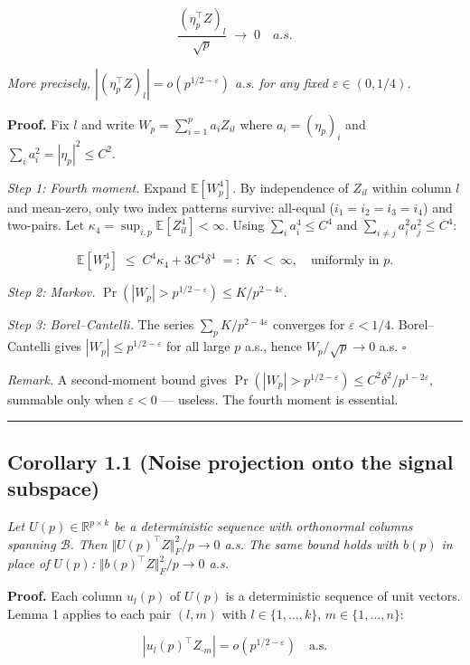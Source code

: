 \documentclass{article}
\theoremstyle{remark}
\begin{document}
\[
\frac{(\eta_p^\top Z)_l}{\sqrt{p}} \;\longrightarrow\; 0 \quad a.s.
\]

\textit{More precisely, $|(\eta_p^\top Z)_l| = o(p^{1/2-\varepsilon})$ a.s. for any fixed $\varepsilon\in(0,1/4)$.}

\textbf{Proof.} Fix $l$ and write $W_p = \sum_{i=1}^p a_i Z_{il}$ where $a_i = (\eta_p)_i$ and $\sum_i a_i^2 = |\eta_p|^2 \le C^2$.

\textit{Step 1: Fourth moment.} Expand $\mathbb{E}[W_p^4]$. By independence of $Z_{il}$ within column $l$ and mean-zero, only two index patterns survive: all-equal ($i_1 = i_2 = i_3 = i_4$) and two-pairs. Let $\kappa_4 = \sup_{i,p}\mathbb{E}[Z_{il}^4] < \infty$. Using $\sum_i a_i^4 \le C^4$ and $\sum_{i\ne j}a_i^2 a_j^2 \le C^4$:

\[
\mathbb{E}[W_p^4] \;\le\; C^4\kappa_4 + 3C^4\delta^4 \;=:\; K \;<\;\infty,\quad\text{uniformly in }p.
\]

\textit{Step 2: Markov.} $\Pr(|W_p| > p^{1/2-\varepsilon}) \le K/p^{2-4\varepsilon}.$

\textit{Step 3: Borel–Cantelli.} The series $\sum_p K/p^{2-4\varepsilon}$ converges for $\varepsilon < 1/4$. Borel–Cantelli gives $|W_p| \le p^{1/2-\varepsilon}$ for all large $p$ a.s., hence $W_p/\sqrt{p} \to 0$ a.s. $\square$

\textit{Remark.} A second-moment bound gives $\Pr(|W_p| > p^{1/2-\varepsilon}) \le C^2\delta^2/p^{1-2\varepsilon}$, summable only when $\varepsilon < 0$ — useless. The fourth moment is essential.

\medskip\noindent\rule{\linewidth}{0.4pt}\medskip

\subsection{Corollary 1.1 (Noise projection onto the signal subspace)}

\textit{Let $U(p)\in\mathbb{R}^{p\times k}$ be a deterministic sequence with orthonormal columns spanning $\mathcal{B}$. Then $\Vert U(p)^\top Z\Vert_F^2/p \to 0$ a.s. The same bound holds with $b(p)$ in place of $U(p)$: $\Vert b(p)^\top Z\Vert_F^2/p \to 0$ a.s.}

\textbf{Proof.} Each column $u_l(p)$ of $U(p)$ is a deterministic sequence of unit vectors. Lemma 1 applies to each pair $(l, m)$ with $l\in\{1,\ldots,k\}$, $m\in\{1,\ldots,n\}$:

\[
|u_l(p)^\top Z_{\cdot m}| = o(p^{1/2-\varepsilon}) \quad\text{a.s.}
\]
\end{document}
